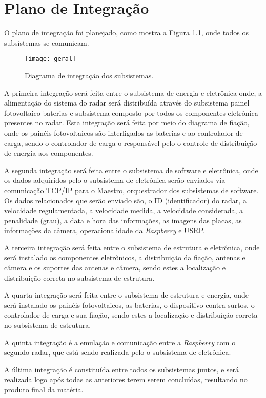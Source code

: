 \chapter{Plano de Integração}

O plano de integração foi planejado, como mostra a Figura \ref{fig:planejamento_integracao}, onde todos os subsistemas se comunicam.

\begin{figure}[H]
    \centering
    \texttt{[image: geral]}
    \caption{Diagrama de integração dos subsistemas.}
    \label{fig:planejamento_integracao}
\end{figure}

A primeira integração será feita entre o subsistema de energia e eletrônica onde, a alimentação do sistema do radar será distribuída através do subsistema painel fotovoltaico-baterias e subsistema composto por todos os componentes eletrônica presentes no radar. Esta integração será feita por meio do diagrama de fiação, onde os painéis fotovoltaicos são interligados as baterias e ao controlador de carga, sendo o controlador de carga o responsável pelo o controle de distribuição de energia aos componentes.

A segunda integração será feita entre o subsistema de software e eletrônica, onde os dados adquiridos pelo o subsistema de eletrônica serão enviados via comunicação TCP/IP para o Maestro, orquestrador dos subsistemas de software. Os dados relacionados que serão enviado são, o ID (identificador) do radar, a velocidade regulamentada, a velocidade medida, a velocidade considerada, a penalidade (grau), a data e hora das informações, as imagens das placas, as informações da câmera, operacionalidade da \emph{Raspberry} e USRP.

A terceira integração será feita entre o subsistema de estrutura e eletrônica, onde será instalado os componentes eletrônicos, a distribuição da fiação, antenas e câmera e os suportes das antenas e câmera, sendo estes a localização e distribuição correta no subsistema de estrutura.

A quarta integração será feita entre o subsistema de estrutura e energia, onde será instalado os painéis fotovoltaicos, as baterias, o dispositivo contra surtos, o controlador de carga e sua fiação, sendo estes a localização e distribuição correta no subsistema de estrutura.

A quinta integração é a emulação e comunicação entre a \emph{Raspberry} com o segundo radar, que está sendo realizada pelo o subsistema de eletrônica.

A última integração é constituída entre todos os subsistemas juntos, e será realizada logo após todas as anteriores terem serem concluídas, resultando no produto final da matéria.